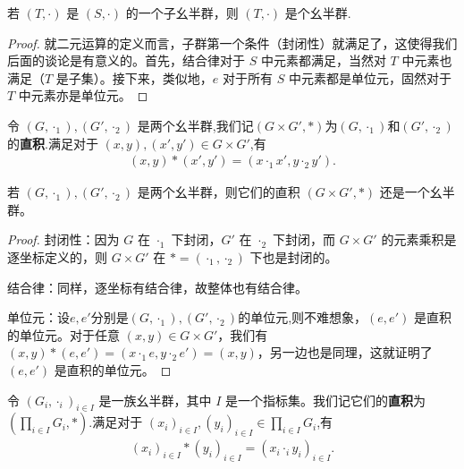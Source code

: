 \documentclass[../../main.tex]{subfiles}
\begin{document}
\begin{proposition}[子幺半群也是幺半群]
若 $(T, \cdot)$ 是 $(S, \cdot)$ 的一个子幺半群，则 $(T, \cdot)$ 是个幺半群.
\end{proposition}
\begin{proof}
就二元运算的定义而言，子群第一个条件（封闭性）就满足了，这使得我们后面的谈论是有意义的。首先，结合律对于 $S$ 中元素都满足，当然对 $T$ 中元素也满足（$T$ 是子集）。接下来，类似地，$e$ 对于所有 $S$ 中元素都是单位元，固然对于 $T$ 中元素亦是单位元。 

\end{proof}

\begin{definition}[两个幺半群的直积]
令 $(G,\cdot_1),(G',\cdot_2)$ 是两个幺半群,我们记$(G\times G',*)$为$(G,\cdot_1)$和$(G',\cdot_2)$的\textbf{直积}.满足对于 $(x,y),(x',y')\in G\times G'$,有
\begin{align*}
(x,y)*(x',y')=(x\cdot_1 x',y\cdot_2 y').
\end{align*}
\end{definition}

\begin{proposition}[两个幺半群的直积仍是幺半群]\label{proposition:两个幺半群的直积仍是幺半群}
若 $(G,\cdot_1),(G',\cdot_2)$ 是两个幺半群，则它们的直积 $(G\times G',*)$ 还是一个幺半群。
\end{proposition}
\begin{proof}
封闭性：因为 $G$ 在 $\cdot_1$ 下封闭，$G'$ 在 $\cdot_2$ 下封闭，而 $G\times G'$ 的元素乘积是逐坐标定义的，则 $G\times G'$ 在 $* = (\cdot_1,\cdot_2)$ 下也是封闭的。

结合律：同样，逐坐标有结合律，故整体也有结合律。

单位元：设$e,e'$分别是$(G,\cdot_1),(G',\cdot_2)$的单位元,则不难想象，$(e,e')$ 是直积的单位元。对于任意 $(x,y)\in G\times G'$，我们有 $(x,y)*(e,e')=(x\cdot_1 e,y\cdot_2 e')=(x,y)$，另一边也是同理，这就证明了 $(e,e')$ 是直积的单位元。

\end{proof}

\begin{definition}[一族幺半群的直积]
令 $(G_i,\cdot_i)_{i\in I}$ 是一族幺半群，其中 $I$ 是一个指标集。我们记它们的\textbf{直积}为 $(\prod_{i\in I}G_i,*)$.满足对于 $(x_i)_{i\in I},(y_i)_{i\in I}\in\prod_{i\in I}G_i$,有
\begin{align*}
(x_i)_{i\in I}*(y_i)_{i\in I}=(x_i\cdot_i y_i)_{i\in I}.
\end{align*}
\end{definition}
\end{document}
